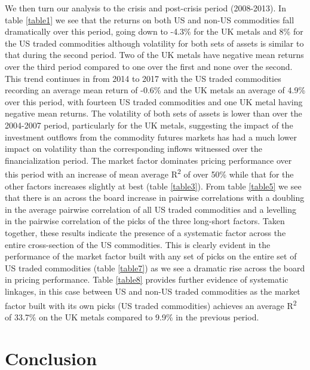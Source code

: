 \documentclass[]{elsarticle} %
\begin{document}
We then turn our analysis to the crisis and post-crisis period
(2008-2013). In table \ref{table1} we see that the returns on both US
and non-US commodities fall dramatically over this period, going down to
-4.3\% for the UK metals and 8\% for the US traded commodities although
volatility for both sets of assets is similar to that during the second
period. Two of the UK metals have negative mean returns over the third
period compared to one over the first and none over the second. This
trend continues in from 2014 to 2017 with the US traded commodities
recording an average mean return of -0.6\% and the UK metals an average
of 4.9\% over this period, with fourteen US traded commodities and one
UK metal having negative mean returns. The volatility of both sets of
assets is lower than over the 2004-2007 period, particularly for the UK
metals, suggesting the impact of the investment outflows from the
commodity futures markets has had a much lower impact on volatility than
the corresponding inflows witnessed over the financialization period.
The market factor dominates pricing performance over this period with an
increase of mean average R\textsuperscript{2} of over 50\% while that
for the other factors increases slightly at best (table \ref{table3}).
From table \ref{table5} we see that there is an across the board
increase in pairwise correlations with a doubling in the average
pairwise correlation of all US traded commodities and a levelling in the
pairwise correlation of the picks of the three long-short factors. Taken
together, these results indicate the presence of a systematic factor
across the entire cross-section of the US commodities. This is clearly
evident in the performance of the market factor built with any set of
picks on the entire set of US traded commodities (table \ref{table7}) as
we see a dramatic rise across the board in pricing performance. Table
\ref{table8} provides further evidence of systematic linkages, in this
case between US and non-US traded commodities as the market factor built
with its own picks (US traded commodities) achieves an average
R\textsuperscript{2} of 33.7\% on the UK metals compared to 9.9\% in the
previous period.

\hypertarget{conclusion}{%
\section{Conclusion}\label{conclusion}}
\end{document}
